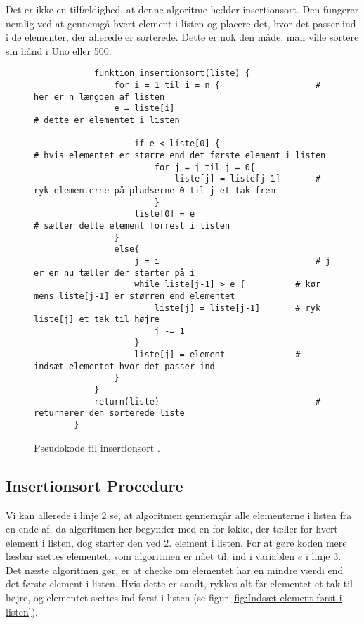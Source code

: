 	Det er ikke en tilfældighed, at denne algoritme hedder insertionsort. Den fungerer nemlig ved at gennemgå hvert element i listen og placere det, hvor det passer ind i de elementer, der allerede er sorterede. Dette er nok den måde, man ville sortere sin hånd i Uno eller 500. 


	\begin{figure}[h]
		\begin{center}
			\begin{lstlisting}
			funktion insertionsort(liste) {
				for i = 1 til i = n {					# her er n længden af listen
				e = liste[i]	 							# dette er elementet i listen

					if e < liste[0] {						# hvis elementet er større end det første element i listen
						for j = j til j = 0{ 
							liste[j] = liste[j-1]		# ryk elementerne på pladserne 0 til j et tak frem
						}
					liste[0] = e 							# sætter dette element forrest i listen
				}
				else{
					j = i 								# j er en nu tæller der starter på i
					while liste[j-1] > e {			# kør mens liste[j-1] er størren end elementet
						liste[j] = liste[j-1] 		# ryk liste[j] et tak til højre
						j -= 1
					}
					liste[j] = element				# indsæt elementet hvor det passer ind
				}
			}			
			return(liste)								# returnerer den sorterede liste
		}
		\end{lstlisting}
	\end{center}
	\vspace{-5mm}
	\caption{Pseudokode til insertionsort \cite[s. 104]{aogd}.}
	\label{fig:Pseudokode til insertionsort}
\end{figure}


	\subsection{Insertionsort Procedure}%
	\label{sub:Insertionsort Procedure}

	Vi kan allerede i linje 2 se, at algoritmen gennemgår alle elementerne i listen fra en ende af, da algoritmen her begynder med en for-løkke, der tæller for hvert element i listen, dog starter den ved 2. element i listen. For at gøre koden mere læsbar sættes elementet, som algoritmen er nået til, ind i variablen $e$ i linje 3. Det næste algoritmen gør, er at checke om elementet har en mindre værdi end det første element i listen. Hvis dette er sandt, rykkes alt før elementet et tak til højre, og elementet sættes ind først i listen (se figur \ref{fig:Indsæt element først i listen}). 

